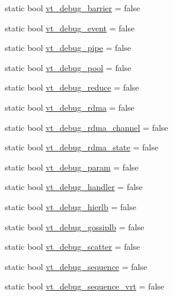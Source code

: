 \begin{DoxyCompactItemize}
\item 
static bool \hyperlink{structvt_1_1arguments_1_1_arg_config_aa521e854796aada164cd0316c48d8e23}{vt\+\_\+debug\+\_\+barrier} = false
\item 
static bool \hyperlink{structvt_1_1arguments_1_1_arg_config_a23460617fec839e7ae8d48427172b6c5}{vt\+\_\+debug\+\_\+event} = false
\item 
static bool \hyperlink{structvt_1_1arguments_1_1_arg_config_aba00af8a95c7fd6d41d08407a5fb33f1}{vt\+\_\+debug\+\_\+pipe} = false
\item 
static bool \hyperlink{structvt_1_1arguments_1_1_arg_config_a5fce7eff37704977022f2591d19471f8}{vt\+\_\+debug\+\_\+pool} = false
\item 
static bool \hyperlink{structvt_1_1arguments_1_1_arg_config_a6001b8760c0e1d53b0e55fc8c9de784e}{vt\+\_\+debug\+\_\+reduce} = false
\item 
static bool \hyperlink{structvt_1_1arguments_1_1_arg_config_a38e43be609c02e54398d44ceca1095fe}{vt\+\_\+debug\+\_\+rdma} = false
\item 
static bool \hyperlink{structvt_1_1arguments_1_1_arg_config_a78388ec62b79383eacf3e48b67a47a21}{vt\+\_\+debug\+\_\+rdma\+\_\+channel} = false
\item 
static bool \hyperlink{structvt_1_1arguments_1_1_arg_config_ade199a9171a20b108af3b3631f82e5d5}{vt\+\_\+debug\+\_\+rdma\+\_\+state} = false
\item 
static bool \hyperlink{structvt_1_1arguments_1_1_arg_config_a7a9c93ea8a341a22ff4d1e58c3543d17}{vt\+\_\+debug\+\_\+param} = false
\item 
static bool \hyperlink{structvt_1_1arguments_1_1_arg_config_aa2652f92547befd3f21fa9e7bf40bf94}{vt\+\_\+debug\+\_\+handler} = false
\item 
static bool \hyperlink{structvt_1_1arguments_1_1_arg_config_a427c7fec8f7075a40014f1e6e65f849b}{vt\+\_\+debug\+\_\+hierlb} = false
\item 
static bool \hyperlink{structvt_1_1arguments_1_1_arg_config_ad7a74adc5ab27891aee08a53e0bade6a}{vt\+\_\+debug\+\_\+gossiplb} = false
\item 
static bool \hyperlink{structvt_1_1arguments_1_1_arg_config_a7f07188c6e8a456e9bfdad9ced6159df}{vt\+\_\+debug\+\_\+scatter} = false
\item 
static bool \hyperlink{structvt_1_1arguments_1_1_arg_config_a871a494f26456713e0e3a2d66d9ed08d}{vt\+\_\+debug\+\_\+sequence} = false
\item 
static bool \hyperlink{structvt_1_1arguments_1_1_arg_config_a8d2ad7c39aea97ec9679b3b660d8c017}{vt\+\_\+debug\+\_\+sequence\+\_\+vrt} = false

\end{DoxyCompactItemize}
